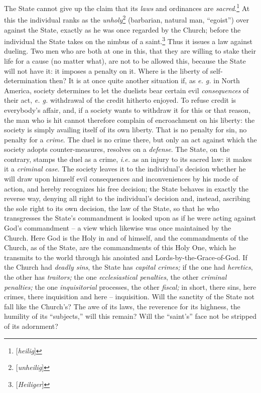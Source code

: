 \documentclass[12pt,a4paper]{book}
\begin{document}
The State cannot give up the claim that its \textit{laws} and ordinances are 
\textit{sacred}.\footnote{[\textit{heilig}]} At this the individual ranks as 
the \textit{unholy}\footnote{[\textit{unheilig}]} (barbarian, natural man, 
``egoist'') over against the State, exactly as he was once regarded by the 
Church; before the individual the State takes on the nimbus of a 
saint.\footnote{[\textit{Heiliger}]} Thus it issues a law against dueling. Two 
men who are both at one in this, that they are willing to stake their life for 
a cause (no matter what), are not to be allowed this, because the State will 
not have it: it imposes a penalty on it. Where is the liberty of 
self-determination then? It is at once quite another situation if, as 
\textit{e. g.} in North America, society determines to let the duelists bear 
certain evil \textit{consequences} of their act, \textit{e. g.} withdrawal of 
the credit hitherto enjoyed. To refuse credit is everybody's affair, and, if a 
society wants to withdraw it for this or that reason, the man who is hit 
cannot therefore complain of encroachment on his liberty: the society is 
simply availing itself of its own liberty. That is no penalty for sin, no 
penalty for a \textit{crime}. The duel is no crime there, but only an act 
against which the society adopts counter-measures, resolves on a 
\textit{defense}. The State, on the contrary, stamps the duel as a crime, 
\textit{i.e.} as an injury to its sacred law: it makes it a \textit{criminal 
case}. The society leaves it to the individual's decision whether he will draw 
upon himself evil consequences and inconveniences by his mode of action, and 
hereby recognizes his free decision; the State behaves in exactly the reverse 
way, denying all right to the individual's decision and, instead, ascribing 
the sole right to its own decision, the law of the State, so that he who 
transgresses the State's commandment is looked upon as if he were acting 
against God's commandment -- a view which likewise was once maintained by the 
Church. Here God is the Holy in and of himself, and the commandments of the 
Church, as of the State, are the commandments of this Holy One, which he 
transmits to the world through his anointed and Lords-by-the-Grace-of-God. If 
the Church had \textit{deadly sins}, the State has \textit{capital crimes;} if 
the one had \textit{heretics}, the other has \textit{traitors;} the one 
\textit{ecclesiastical penalties}, the other \textit{criminal penalties;} the 
one \textit{inquisitorial} processes, the other \textit{fiscal;} in short, 
there sins, here crimes, there inquisition and here -- inquisition. Will the 
sanctity of the State not fall like the Church's? The awe of its laws, the 
reverence for its highness, the humility of its ``subjects,'' will this 
remain? Will the ``saint's'' face not be stripped of its adornment?
\end{document}

